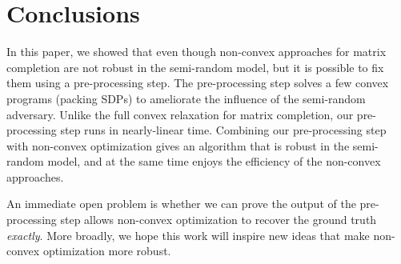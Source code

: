 
\section{Conclusions}

In this paper, we showed that even though non-convex approaches for matrix completion are not robust in the semi-random model, but it is possible to fix them using a pre-processing step.
The pre-processing step solves a few convex programs (packing SDPs) to ameliorate the influence of the semi-random adversary. %
Unlike the full convex relaxation for matrix completion, our pre-processing step runs in nearly-linear time. Combining our pre-processing step with non-convex optimization gives an algorithm that is robust in the semi-random model, and at the same time enjoys the efficiency of the non-convex approaches.


An immediate open problem is whether we can prove the output of the pre-processing step allows non-convex optimization to recover the ground truth {\em exactly}.
More broadly, we hope this work will inspire new ideas that make non-convex optimization more robust.